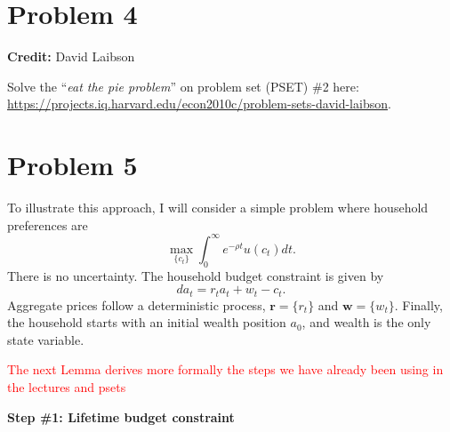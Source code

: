 \documentclass[11pt]{extarticle}
\theoremstyle{plain}
\theoremstyle{definition}
\begin{document}
\vspace{10mm}
\section*{Problem 4}

\textbf{Credit:} David Laibson

\vspace{5mm}
\noindent
Solve the ``\textit{eat the pie problem}'' on problem set (PSET) \#2 here: \url{https://projects.iq.harvard.edu/econ2010c/problem-sets-david-laibson}.





\vspace{10mm}
\section*{Problem 5}


To illustrate this approach, I will consider a simple problem where household preferences are 
\begin{equation*}
	\max_{\{c_t\}} \int_0^\infty e^{- \rho t} u(c_t) dt. 
\end{equation*}
There is no uncertainty. The household budget constraint is given by
\begin{equation*}
	da_t = r_t a_t + w_t - c_t. 
\end{equation*}
Aggregate prices follow a deterministic process, $\bm{r} = \{r_t\}$ and $\bm{w} = \{w_t\}$. Finally, the household starts with an initial wealth position $a_0$, and wealth is the only state variable. 



\textcolor{red}{The next Lemma derives more formally the steps we have already been using in the lectures and psets}

\vspace{5mm}
\noindent
\textbf{Step \#1: Lifetime budget constraint}
\end{document}
